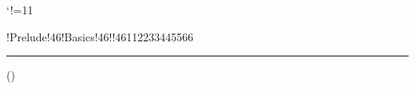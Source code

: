 


\newarray\PrevSP
\newarray\FrameData

\newcount\Frame
\newcount\SP
\newcount\SQ
\newcount\RetValue

\catcode`!=11


\def\idris!Prelude!46!Basics!46!!46#1#2#3#4#5#6{
 \advance\Frame by 1\relax
 \PrevSP(\Frame)={\the\SP}
 \SP=\SQ
 \advance\SP by 1\relax
 \SQ=\SP
 \advance\SP by -1
 \idris!!123!APPLY0!125!{#5}{#6}
 \FrameData(\SP)=\RetValue
 \idris!!123!APPLY0!125!{#4}{\the\RetValue}
 \SQ=\SP
 \advance\Frame by -1 \relax
 \SP=\PrevSP(\Frame) \relax
}

\def\idris!!123!APPLY0!125!#1#2{(#1,#2)}


\idris!Prelude!46!Basics!46!!46{11}{22}{33}{44}{55}{66}


\the\Frame
\hrule
\PrevSP(\Frame)



\bye
